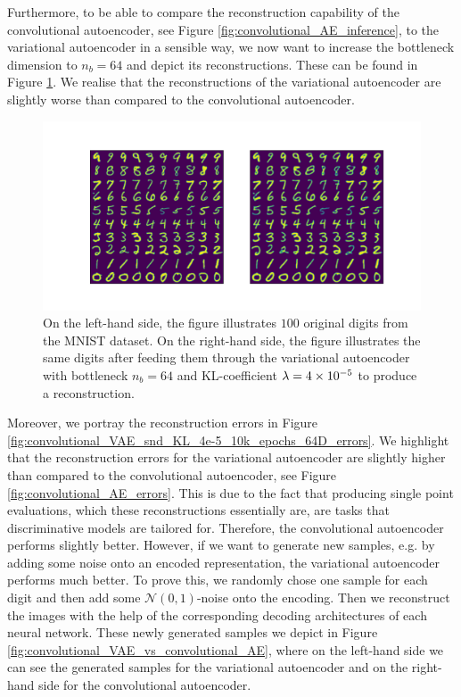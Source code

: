 Furthermore, to be able to compare the reconstruction capability of the convolutional autoencoder, see Figure \ref{fig:convolutional_AE_inference}, to the variational autoencoder in a sensible way, we now want to increase the bottleneck dimension to $n_b=64$ and depict its reconstructions. These can be found in Figure \ref{fig:convolutional_VAE_snd_KL_4e-5_10k_epochs_64D_inference}. We realise that the reconstructions of the variational autoencoder are slightly worse than compared to the convolutional autoencoder.

\begin{figure}
\begin{center}
      \includegraphics[trim = 15mm 10mm 15mm 15mm, clip, width=\linewidth]{convolutional_VAE_snd_KL_4e-5_10k_epochs_64D_inference}
\end{center}
\caption{On the left-hand side, the figure illustrates $100$ original digits from the MNIST dataset. On the right-hand side, the figure illustrates the same digits after feeding them through the variational autoencoder with bottleneck $n_b=64$ and KL-coefficient $\lambda = \num{4e-5}$ to produce a reconstruction.}\label{fig:convolutional_VAE_snd_KL_4e-5_10k_epochs_64D_inference}
\end{figure}


Moreover, we portray the reconstruction errors in Figure \ref{fig:convolutional_VAE_snd_KL_4e-5_10k_epochs_64D_errors}. We highlight that the reconstruction errors for the variational autoencoder are slightly higher than compared to the convolutional autoencoder, see Figure \ref{fig:convolutional_AE_errors}. This is due to the fact that producing single point evaluations, which these reconstructions essentially are, are tasks that discriminative models are tailored for. Therefore, the convolutional autoencoder performs slightly better. However, if we want to generate new samples, e.g. by adding some noise onto an encoded representation, the variational autoencoder performs much better. To prove this, we randomly chose one sample for each digit and then add some $\mathcal{N}(0, 1)$-noise onto the encoding. Then we reconstruct the images with the help of the corresponding decoding architectures of each neural network. These newly generated samples we depict in Figure \ref{fig:convolutional_VAE_vs_convolutional_AE}, where on the left-hand side we can see the generated samples for the variational autoencoder and on the right-hand side for the convolutional autoencoder.

